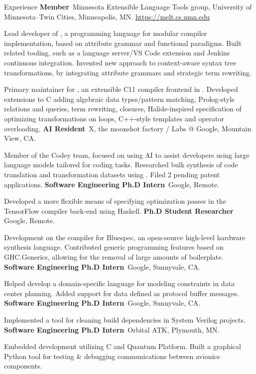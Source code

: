 \begin{rubric}{Experience}
\entry*[2014 -- $\cdots$]%
	\textbf{Member}\, Minnesota Extensible Language Tools group, University of Minnesota--Twin Cities, Minneapolis, MN.
	\url{https://melt.cs.umn.edu}
	\par Lead developer of \silver{}, a programming language for modular compiler
	implementation, based on attribute grammar and functional paradigms.
	Built related tooling, such as a language server/VS Code extension and Jenkins continuous integration.
	Invented new approach to context-aware syntax tree transformations, by integrating attribute grammars and strategic term rewriting.
	\par Primary maintainer for \ableC{}, an extensible C11 compiler frontend in \silver{}.
	Developed extensions to C adding algebraic data types/pattern matching, Prolog-style relations and queries,
	term rewriting, closures, Halide-inspired specification of optimizing transformations on loops, C++-style templates and operator overloading.
%
\entry*[2021 -- 2023]%
	\textbf{AI Resident}\, X, the moonshot factory / Labs @ Google, Mountain View, CA.
	\par Member of the Codey team, focused on using AI to assist developers using large language models tailored for coding tasks.
	Researched bulk synthesis of code translation and transformation datasets using \silver{}.
	Filed 2 pending patent applications.
%
\entry*[2021]%
	\textbf{Software Engineering Ph.D Intern}\, Google, Remote.
	\par Developed a more flexible means of specifying optimization passes in the TensorFlow compiler back-end using Haskell.
%
\entry*[2020 -- 2021]%
	\textbf{Ph.D Student Researcher}\, Google, Remote.
	\par Development on the compiler for Bluespec, an open-source high-level hardware synthesis language.
	Contributed generic programming features based on GHC.Generics, allowing for the removal of large amounts of boilerplate.
%
\entry*[2019]%
	\textbf{Software Engineering Ph.D Intern}\, Google, Sunnyvale, CA.
	\par Helped develop a domain-specific language for modeling constraints in data center planning.
	Added support for data defined as protocol buffer messages.
%
\entry*[2018]%
	\textbf{Software Engineering Ph.D Intern}\, Google, Sunnyvale, CA.
	\par Implemented a tool for cleaning build dependencies in System Verilog projects.
%
\entry*[2017]%
	\textbf{Software Engineering Ph.D Intern}\, Orbital ATK, Plymouth, MN.
	\par Embedded development utilizing C and Quantum Platform.
	Built a graphical Python tool for testing \& debugging communications between avionics components.
%
\end{rubric}